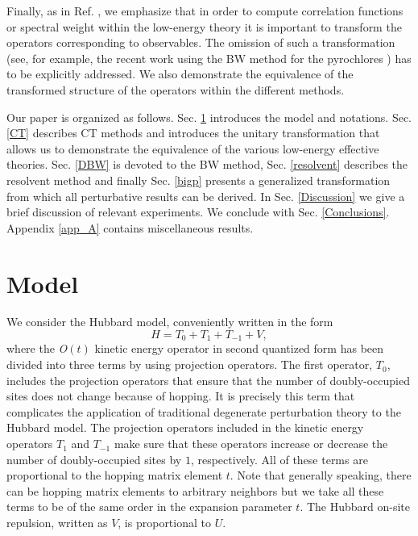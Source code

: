 \documentclass[floatfix,twocolumn,aps,prb,showpacs,superscriptaddress]{revtex4}
\begin{document}
Finally, as in Ref. , we emphasize that in
order to compute correlation functions or spectral weight within the
low-energy theory it is important to
transform the operators corresponding to observables.
The omission of such a transformation (see, for example,
the recent work using the BW method for the pyrochlores \cite%
{Hemerle:2003,NoteFisher}) has to be explicitly addressed. We also demonstrate the
equivalence of the transformed structure of the operators within the
different methods.


Our paper is organized as follows. Sec. \ref{Model} introduces the model and
notations. Sec. \ref{CT} describes CT methods and introduces the unitary
transformation that allows us to demonstrate the equivalence of the various
low-energy effective theories. Sec. \ref{DBW} is devoted to the BW method,
 Sec. \ref{resolvent} describes the resolvent method and finally
 Sec. \ref{bigp} presents a generalized transformation from which all
 perturbative results can be derived. In Sec. \ref{Discussion} 
we give a brief
 discussion of relevant experiments. We conclude 
with Sec. \ref{Conclusions}. Appendix \ref{app_A} contains miscellaneous
results.




\section{Model}


\label{Model}


We consider the Hubbard model, conveniently written in the
form \cite{Harris:1967}
\begin{equation}
H=T_{0}+T_{1}+T_{-1}+V,  \label{H}
\end{equation}%
where the \emph{O}$(t)$ kinetic energy operator in second quantized form has
been divided into three terms by using projection operators. The first
operator, $T_{0}$, includes the projection operators that ensure that the
number of doubly-occupied sites does not change because of hopping. It
is precisely this term that complicates the application of traditional
degenerate perturbation theory to the Hubbard model.  The 
projection operators included in the kinetic energy operators $T_{1}$ and $%
T_{-1}$ make sure that these operators increase or decrease the number
of doubly-occupied sites by $1$, respectively. All of these
terms are proportional to the hopping matrix element $t$. Note that
generally speaking, there can be hopping matrix elements to arbitrary
neighbors but we take all these terms to be of the same order in the
expansion parameter $t$. The Hubbard on-site repulsion, written as $V$,
is proportional to $U$.
\end{document}
